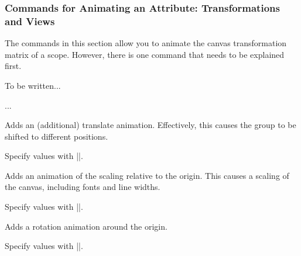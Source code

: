 \subsubsection{Commands for Animating an Attribute: Transformations  and Views}

The commands in this section allow you to animate the canvas
transformation matrix of a scope. However, there is one command that
needs to be explained first.

\begin{command}{\pgfsys@animation@canvas@transform{}}
  To be written...

\begin{codeexample}[]
...
\end{codeexample}
\end{command}


\begin{command}{\pgfsys@animatetranslate}
  Adds an (additional) translate animation. Effectively, this causes
  the group to be shifted to different positions.
  
  Specify values with |\pgfsys@animation@translate|. 
\begin{codeexample}[width=2cm]
\end{codeexample}
\end{command}

\begin{command}{\pgfsys@animatescale}
  Adds an animation of the scaling relative to the origin. This causes
  a scaling of the canvas, including fonts and line widths.
  
  Specify values with |\pgfsys@animation@scale|.
\begin{codeexample}[width=2cm]
\end{codeexample}
\end{command}

\begin{command}{\pgfsys@animaterotate}
  Adds a rotation animation around the origin.
  
  Specify values with |\pgfsys@animation@scalar|.
\begin{codeexample}[width=2cm]
\end{codeexample}
\end{command}

